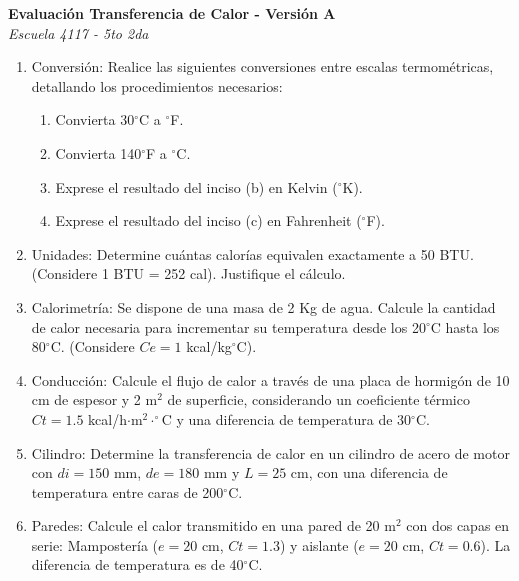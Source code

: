 \documentclass[a4paper,10pt]{article}
\newenvironment{versionexamen}[1]{
  \begin{minipage}[t]{0.48\textwidth}
    \textbf{Evaluación Transferencia de Calor - Versión #1} \\
    \textit{Escuela 4117 - 5to 2da}
    \begin{enumerate}[label=\textbf{\arabic*.}, leftmargin=15pt, topsep=4pt, itemsep=4pt]
      \small
}{
    \end{enumerate}
    \vspace{0.4cm}
  \end{minipage}
}
\begin{document}
\begin{versionexamen}{A}
	\item Conversión: Realice las siguientes conversiones entre escalas termométricas, detallando los procedimientos necesarios:
	\begin{enumerate}[label=\alph*., nosep, leftmargin=15pt]
		\item Convierta 30$^\circ$C a $^\circ$F.
		\item Convierta 140$^\circ$F a $^\circ$C.
		\item Exprese el resultado del inciso (b) en Kelvin ($^\circ$K).
		\item Exprese el resultado del inciso (c) en Fahrenheit ($^\circ$F).
	\end{enumerate}
	\item Unidades: Determine cuántas calorías equivalen exactamente a 50 BTU. (Considere 1 BTU = 252 cal). Justifique el cálculo.
	\item Calorimetría: Se dispone de una masa de 2 Kg de agua. Calcule la cantidad de calor necesaria para incrementar su temperatura desde los 20$^\circ$C hasta los 80$^\circ$C. (Considere $Ce=1$ kcal/kg$^\circ$C).
	\item Conducción: Calcule el flujo de calor a través de una placa de hormigón de 10 cm de espesor y 2 m$^2$ de superficie, considerando un coeficiente térmico $Ct=1.5$ kcal/h$\cdot$m$^2\cdot^\circ$C y una diferencia de temperatura de 30$^\circ$C.
	\item Cilindro: Determine la transferencia de calor en un cilindro de acero de motor con $di=150$ mm, $de=180$ mm y $L=25$ cm, con una diferencia de temperatura entre caras de 200$^\circ$C.
	\item Paredes: Calcule el calor transmitido en una pared de 20 m$^2$ con dos capas en serie: Mampostería ($e=20$ cm, $Ct=1.3$) y aislante ($e=20$ cm, $Ct=0.6$). La diferencia de temperatura es de 40$^\circ$C.
\end{versionexamen}
\hfill
\end{document}
